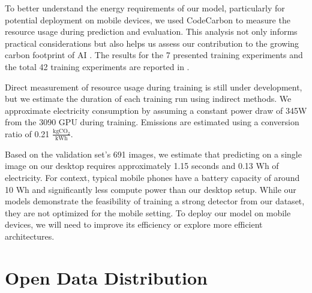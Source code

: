 \documentclass[10pt,twocolumn,letterpaper]{article}
\newcommand{\cotwo}{\ensuremath{\mathrm{CO_2}}}
\begin{document}
To better understand the energy requirements of our model, particularly for potential deployment on mobile
  devices, we used CodeCarbon \cite{lacoste2019codecarbon} to measure the resource usage during prediction and
  evaluation.
This analysis not only informs practical considerations but also helps us assess our contribution to the
  growing carbon footprint of AI \cite{kirkpatrick_carbon_2023}.
The results for the 7 presented training experiments and the total 42 training experiments are reported in
  .

Direct measurement of resource usage during training is still under development, but we estimate the
  duration of each training run using indirect methods.
We approximate electricity consumption by assuming a constant power draw of 345W from the 3090 GPU during
  training.
Emissions are estimated using a conversion ratio of 0.21 $\frac{\textrm{kg}\cotwo{}}{\textrm{kWh}}$.
  
Based on the validation set's 691 images, we estimate that predicting on a single image on our desktop
  requires approximately 1.15 seconds and 0.13 Wh of electricity.
For context, typical mobile phones have a battery capacity of around 10 Wh and significantly less compute
  power than our desktop setup.
While our models demonstrate the feasibility of training a strong detector from our dataset, they are not
  optimized for the mobile setting.
To deploy our model on mobile devices, we will need to improve its efficiency or explore more efficient
  architectures.




\section{Open Data Distribution}
\label{sec:distribution}

  
\end{document}
